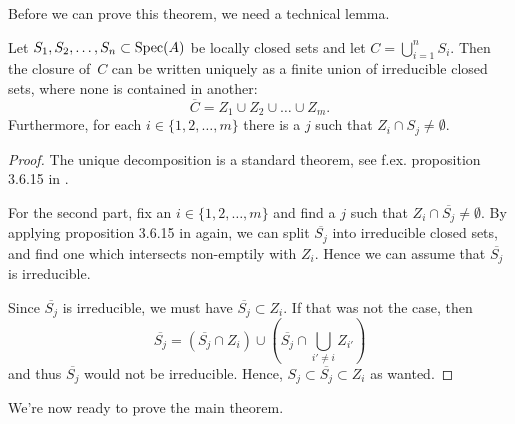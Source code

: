 Before we can prove this theorem, we need a technical lemma.

\begin{lemma}\label{lem:irred_has_opens}
  Let $S_{1}, S_{2}, \dots, S_{n} \subset \operatorname{Spec}(A)$ be locally closed sets and let $C = \bigcup_{i=1}^{n} S_{i}$. Then the closure of $\,C$ can be written uniquely as a finite union of irreducible closed sets, where none is contained in another:
  \[\overline C = Z_{1} \cup Z_{2} \cup \dots \cup Z_{m}.\]
  Furthermore, for each $i \in \{1, 2, \dots, m\}$ there is a $j$ such that $Z_{i} \cap S_{j} \neq \emptyset$.
\end{lemma}
\begin{proof}
  The unique decomposition is a standard theorem, see f.ex. proposition 3.6.15 in \cite{FOAG}.

  For the second part, fix an $i \in \{1, 2, \dots, m\}$ and find a $j$ such that $Z_{i} \cap \overline{S_{j}} \neq \emptyset$. By applying proposition 3.6.15 in \cite{FOAG} again, we can split $\overline{S_{j}}$ into irreducible closed sets, and find one which intersects non-emptily with $Z_{i}$. Hence we can assume that $\overline{S_{j}}$ is irreducible.

  Since $\overline{S_{j}}$ is irreducible, we must have $\overline{S_{j}} \subset Z_{i}$. If that was not the case, then \[\overline{S_{j}} = (\overline{S_{j}} \cap Z_{i}) \cup (\overline{S_{j}} \cap \bigcup_{i' \neq i} Z_{i'})\] and thus $\overline{S_{j}}$ would not be irreducible. Hence, $S_{j} \subset \overline{S_{j}} \subset Z_{i}$ as wanted.
\end{proof}

We're now ready to prove the main theorem.

